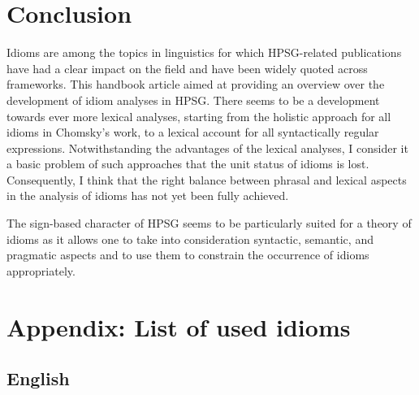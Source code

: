 \documentclass[output=paper
 	        ,biblatex
                ,babelshorthands
                ,newtxmath
                ,draftmode
                ,colorlinks, citecolor=brown
]{langscibook}
\begin{document}
\section{Conclusion}
\label{Sec-Summary}

Idioms are among the topics in linguistics for which HPSG-related publications have had a clear
impact on the field and have been widely quoted across frameworks.  This handbook article aimed at
providing an overview over the development of idiom analyses in HPSG.  There seems to be a
development towards ever more lexical analyses, starting from the holistic approach for all idioms
in Chomsky's work, to a lexical account for all syntactically regular expressions.  Notwithstanding
the advantages of the lexical analyses, I consider it a basic problem of such approaches that the
unit status of idioms is lost. Consequently, I think that the right balance between phrasal and
lexical aspects in the analysis of idioms has not yet been fully achieved.

The sign-based character of HPSG seems to be particularly suited for a theory of idioms as it allows
one to take into consideration syntactic, semantic, and pragmatic aspects and to use them to
constrain the occurrence of idioms appropriately.


\section*{Appendix: List of used idioms}

\subsection*{English}
\end{document}

